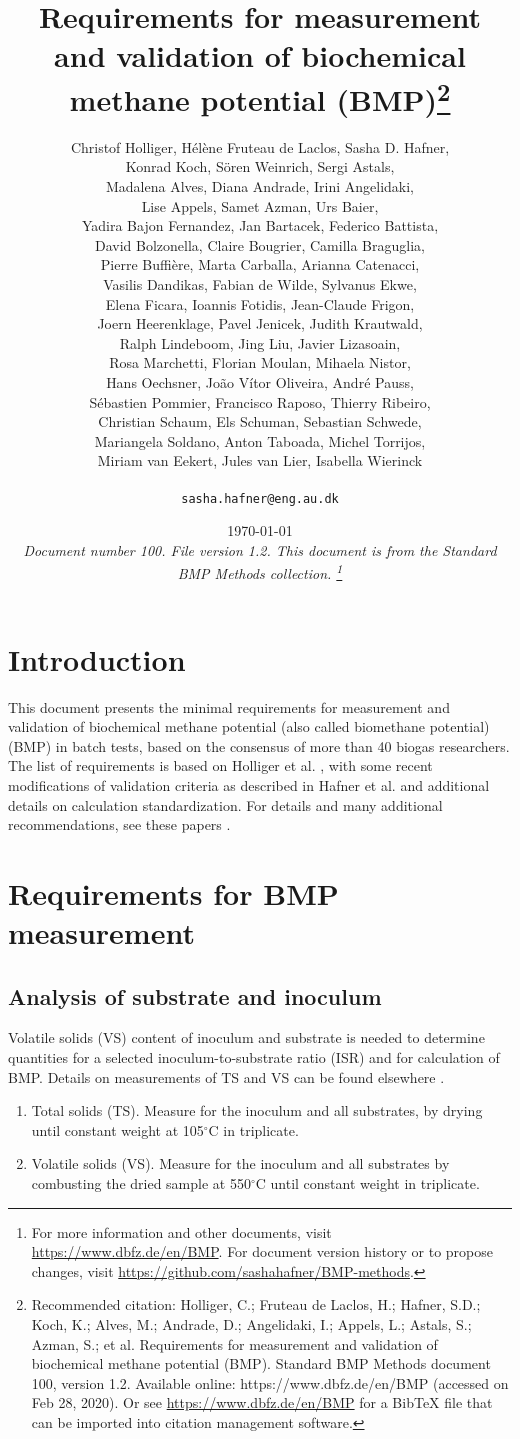 \documentclass[]{article}
\title {Requirements for measurement and validation of biochemical methane potential (BMP)\footnote{
  Recommended citation: 
Holliger, C.; Fruteau de Laclos, H.; Hafner, S.D.; Koch, K.; Alves, M.; Andrade, D.; Angelidaki, I.; Appels, L.; Astals, S.; Azman, S.; et al. Requirements for measurement and validation of biochemical methane potential (BMP). Standard BMP Methods document 100, version 1.2. Available online: https://www.dbfz.de/en/BMP (accessed on Feb 28, 2020).
\newline
  Or see \url{https://www.dbfz.de/en/BMP} for a BibTeX file that can be imported into citation management software.
}}
\author{
Christof Holliger, 
H{\'e}l{\`e}ne Fruteau de Laclos,
Sasha D. Hafner,\\
Konrad Koch,
S{\"o}ren Weinrich,
Sergi Astals, \\
Madalena Alves, 
Diana Andrade,
Irini Angelidaki,\\
Lise Appels,
Samet Azman,
Urs Baier,\\
Yadira Bajon Fernandez,
Jan Bartacek,
Federico Battista,\\
David Bolzonella,
Claire Bougrier,
Camilla Braguglia,\\
Pierre Buffi{\`e}re,
Marta Carballa,
Arianna Catenacci,\\
Vasilis Dandikas,
Fabian de Wilde,
Sylvanus Ekwe,\\
Elena Ficara,
Ioannis Fotidis,
Jean-Claude Frigon, \\
Joern Heerenklage,
Pavel Jenicek,
Judith Krautwald,\\
Ralph Lindeboom,
Jing Liu,
Javier Lizasoain,\\
Rosa Marchetti,
Florian Moulan,
Mihaela Nistor,\\
Hans Oechsner,
Jo{\~a}o V{\'i}tor Oliveira,
Andr{\'e} Pauss,\\
S{\'e}bastien Pommier,
Francisco Raposo,
Thierry Ribeiro,\\
Christian Schaum,
Els Schuman,
Sebastian Schwede,\\
Mariangela Soldano,
Anton Taboada,
Michel Torrijos, \\
Miriam van Eekert,
Jules van Lier,
Isabella Wierinck\\
\\
\texttt{sasha.hafner@eng.au.dk}
}
\date{\today \\
\bigskip
\textit{
  Document number 100.
  File version 1.2. 
  This document is from the Standard BMP Methods collection.
    \footnote{For more information and other documents, visit \url{https://www.dbfz.de/en/BMP}. 
    For document version history or to propose changes, visit \url{https://github.com/sashahafner/BMP-methods}.}
}
}
\begin{document}
\maketitle

\section{Introduction}
This document presents the minimal requirements for measurement and validation of biochemical methane potential (also called biomethane potential) (BMP) in batch tests, based on the consensus of more than 40 biogas researchers.
The list of requirements is based on Holliger et al. \cite{holliger_towards_2016}, with some recent modifications of validation criteria as described in Hafner et al. \cite{hafner_improving_nodate} and additional details on calculation standardization.
For details and many additional recommendations, see these papers \cite{holliger_towards_2016,hafner_improving_nodate}.

\section{Requirements for BMP measurement}
\subsection{Analysis of substrate and inoculum}
\label{sec:analysis}
  Volatile solids (VS) content of inoculum and substrate is needed to determine quantities for a selected inoculum-to-substrate ratio (ISR) and for calculation of BMP.
   Details on measurements of TS and VS can be found elsewhere \cite{strach_determination_2016, baird_standard_2017}. 

  \begin{enumerate}
    \item Total solids (TS). Measure for the inoculum and all substrates, by drying until constant weight at 105$^\circ$C in triplicate.
    \item Volatile solids (VS). Measure for the inoculum and all substrates by combusting the dried sample at 550$^\circ$C until constant weight in triplicate.
  \end{enumerate}
\end{document}
